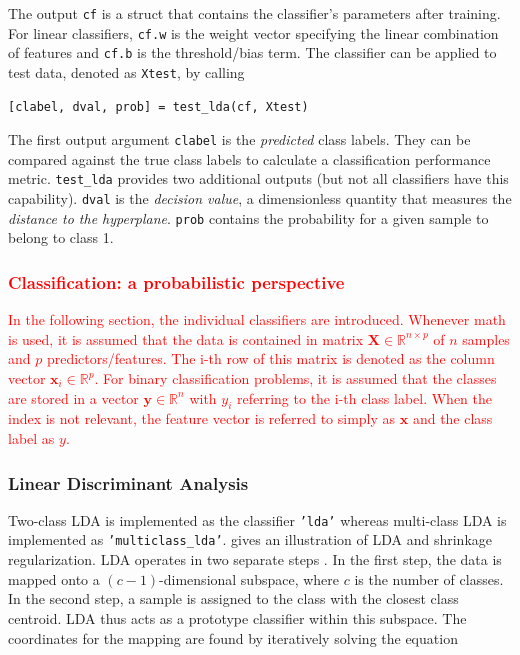 \documentclass[utf8]{frontiersSCNS} %
\newcommand{\x}{\mathbf{x}}
\newcommand{\R}{\mathbb{R}}
\newcommand{\X}{\mathbf{X}}
\newcommand{\ttt}[1]{\texttt{#1}}
\newcommand{\red}[1]{\textcolor{red}{#1}}
\begin{document}
The output \ttt{cf} is a struct that contains the classifier's parameters after training. For linear classifiers, \ttt{cf.w} is the weight vector specifying the linear combination of features and \ttt{cf.b} is the threshold/bias term. The classifier can be applied to test data, denoted as \ttt{Xtest}, by calling

\begin{verbatim}
[clabel, dval, prob] = test_lda(cf, Xtest)
\end{verbatim}

The first output argument \ttt{clabel} is the \textit{predicted} class labels. They can be compared against the true class labels to calculate a classification performance metric. \ttt{test\_lda} provides two additional outputs (but not all classifiers have this capability). \ttt{dval} is the \textit{decision value}, a dimensionless quantity that measures the \textit{distance to the hyperplane}. \ttt{prob} contains the probability for a given sample to belong to class 1. 

\subsubsection{\red{Classification: a probabilistic perspective}}

\red{In the following section, the individual classifiers are introduced. Whenever math is used, it is assumed that the data is contained in matrix $\X\in\R^{n \times p}$ of $n$ samples and $p$ predictors/features. The i-th row of this matrix is denoted as the column vector $\x_i\in\R^p$. For binary classification problems, it is assumed that the classes are stored in a vector $\mathbf{y}\in\R^n$ with $y_i$ referring to the i-th class label. When the index is not relevant, the feature vector is referred to simply as $\x$ and the class label as $y$.}

\subsubsection{Linear Discriminant Analysis}

Two-class LDA is implemented as the classifier \ttt{'lda'} whereas multi-class LDA is implemented as \texttt{'multiclass\_lda'}.  gives an illustration of LDA and shrinkage regularization. LDA operates in two separate steps \citep{Fisher1936}. In the first step, the data is mapped onto a $(c-1)$-dimensional subspace, where $c$ is the number of classes. In the second step, a sample is assigned to the class with the closest class centroid. LDA thus acts as a prototype classifier within this subspace. The coordinates for the mapping are found by iteratively solving the equation
\end{document}
